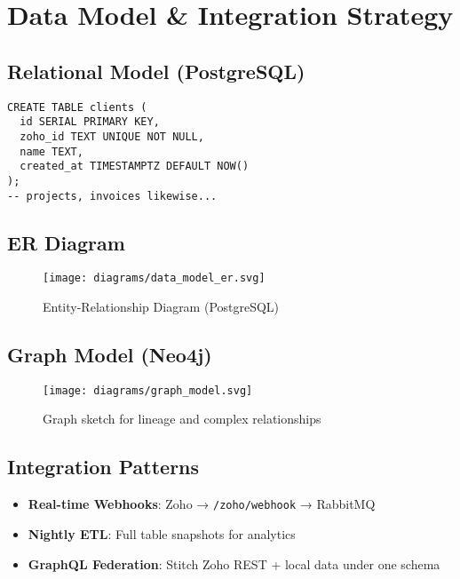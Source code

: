 \section{Data Model \& Integration Strategy}

\subsection{Relational Model (PostgreSQL)}
\begin{verbatim}
CREATE TABLE clients (
  id SERIAL PRIMARY KEY,
  zoho_id TEXT UNIQUE NOT NULL,
  name TEXT,
  created_at TIMESTAMPTZ DEFAULT NOW()
);
-- projects, invoices likewise...
\end{verbatim}

\subsection{ER Diagram}
\begin{figure}[h]
  \centering
  \texttt{[image: diagrams/data\_model\_er.svg]}
  \caption{Entity-Relationship Diagram (PostgreSQL)}
\end{figure}

\subsection{Graph Model (Neo4j)}
\begin{figure}[h]
  \centering
  \texttt{[image: diagrams/graph\_model.svg]}
  \caption{Graph sketch for lineage and complex relationships}
\end{figure}

\subsection{Integration Patterns}
\begin{itemize}
  \item \textbf{Real-time Webhooks}: Zoho → \texttt{/zoho/webhook} → RabbitMQ
  \item \textbf{Nightly ETL}: Full table snapshots for analytics
  \item \textbf{GraphQL Federation}: Stitch Zoho REST + local data under one schema
\end{itemize} 